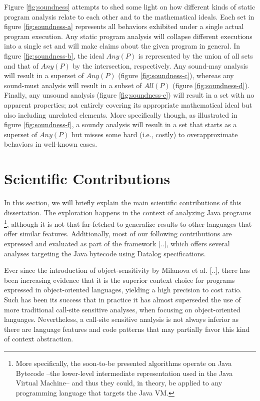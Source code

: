Figure \ref{fig:soundness} attempts to shed some light on how different kinds
of static program analysis relate to each other and to the mathematical ideals.
Each set in figure \ref{fig:soundness-a} represents all behaviors exhibited
under a single actual program execution. Any static program analysis will
collapse different executions into a single set and will make claims about the
given program in general. In figure \ref{fig:soundness-b}, the ideal $Any(P)$
is represented by the union of all sets and that of $Any(P)$ by the
intersection, respectively. Any sound-may analysis will result in a superset of
$Any(P)$ (figure \ref{fig:soundness-c}), whereas any sound-must analysis will
result in a subset of $All(P)$ (figure \ref{fig:soundness-d}). Finally, any
unsound analysis (figure \ref{fig:soundness-e}) will result in a set with no
apparent properties; not entirely covering its appropriate mathematical ideal
but also including unrelated elements. More specifically though, as illustrated
in figure \ref{fig:soundness-f}, a soundy analysis will result in a set that
starts as a superset of $Any(P)$ but misses some hard (i.e., costly) to
overapproximate behaviors in well-known cases.


\section{Scientific Contributions}

In this section, we will briefly explain the main scientific contributions of
this dissertation. The exploration happens in the context of analyzing Java
programs \footnote{More specifically, the soon-to-be presented algorithms
operate on Java Bytecode --the lower-level intermediate representation used in
the Java Virtual Machine-- and thus they could, in theory, be applied to any
programming language that targets the Java VM.}, although it is not that
far-fetched to generalize results to other languages that offer similar
features. Additionally, most of our following contributions are expressed and
evaluated as part of the \doop{} framework [..], which offers several analyses
targeting the Java bytecode using Datalog specifications.

Ever since the introduction of object-sensitivity by Milanova et al. [..],
there has been increasing evidence that it is the superior context choice for
programs expressed in object-oriented languages, yielding a high precision to
cost ratio. Such has been its success that in practice it has almost superseded
the use of more traditional call-site sensitive analyses, when focusing on
object-oriented languages. Nevertheless, a call-site sensitive analysis is not
always inferior as there are language features and code patterns that may
partially favor this kind of context abstraction.

